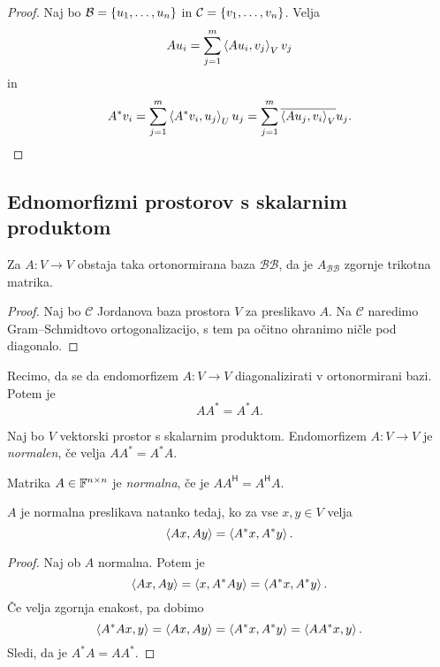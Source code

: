 \documentclass[12pt, a4paper]{article}
\begin{document}
\begin{proof}
Naj bo $\mathcal{B}=\left\{u_1,\dots,u_n\right\}$ in $\mathcal{C}=\left\{v_1,\dots,v_n\right\}$. Velja
\[
Au_i=\sum_{j=1}^m\left\langle Au_i,v_j\right\rangle_Vv_j
\]
in
\[
A^*v_i=\sum_{j=1}^m\left\langle A^*v_i,u_j\right\rangle_Uu_j=\sum_{j=1}^m\overline{\left\langle Au_j,v_i\right\rangle_V}u_j.\qedhere
\]
\end{proof}

\newpage

\subsection{Ednomorfizmi prostorov s skalarnim produktom}

\begin{izrek}[Schur]
Za $A\colon V\to V$ obstaja taka ortonormirana baza $\mathcal{BB}$, da je $A_{\mathcal{BB}}$ zgornje trikotna matrika.
\end{izrek}

\begin{proof}
Naj bo $\mathcal{C}$ Jordanova baza prostora $V$ za preslikavo $A$. Na $\mathcal{C}$ naredimo Gram--Schmidtovo ortogonalizacijo, s tem pa očitno ohranimo ničle pod diagonalo.
\end{proof}

\begin{opomba}
Recimo, da se da endomorfizem $A\colon V\to V$ diagonalizirati v ortonormirani bazi. Potem je
\[
AA^*=A^*A.
\]
\end{opomba}

\begin{okvir}
\begin{definicija}
Naj bo $V$ vektorski prostor s skalarnim produktom. Endomorfizem $A\colon V\to V$ je \emph{normalen}, če velja $AA^*=A^*A$.
\end{definicija}

\begin{definicija}
Matrika $A\in\mathbb{F}^{n\times n}$ je \emph{normalna}, če je $AA^\mathsf{H}=A^\mathsf{H}A$.
\end{definicija}
\end{okvir}

\begin{trditev}
$A$ je normalna preslikava natanko tedaj, ko za vse $x,y\in V$ velja
\[
\left\langle Ax,Ay\right\rangle=\left\langle A^*x,A^*y\right\rangle.
\]
\end{trditev}

\begin{proof}
Naj ob $A$ normalna. Potem je
\[
\left\langle Ax,Ay\right\rangle=\left\langle x,A^*Ay\right\rangle=\left\langle A^*x,A^*y\right\rangle.
\]
Če velja zgornja enakost, pa dobimo
\[
\left\langle A^*Ax,y\right\rangle=\left\langle Ax,Ay\right\rangle=\left\langle A^*x,A^*y\right\rangle=\left\langle AA^*x,y\right\rangle.
\]
Sledi, da je $A^*A=AA^*$.
\end{proof}
\end{document}
